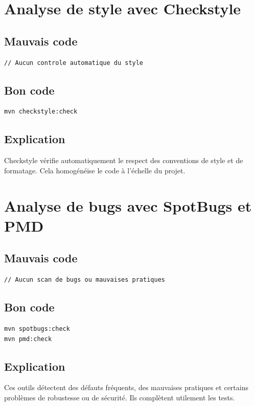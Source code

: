 \documentclass[a4paper,11pt]{report}
\begin{document}
\chapter{Analyse de style avec Checkstyle}

\section{Mauvais code}
\begin{lstlisting}
// Aucun controle automatique du style
\end{lstlisting}

\section{Bon code}
\begin{lstlisting}[language=bash]
mvn checkstyle:check
\end{lstlisting}

\section{Explication}
Checkstyle vérifie automatiquement le respect des conventions de style et de formatage.
Cela homogénéise le code à l'échelle du projet.

\chapter{Analyse de bugs avec SpotBugs et PMD}

\section{Mauvais code}
\begin{lstlisting}
// Aucun scan de bugs ou mauvaises pratiques
\end{lstlisting}

\section{Bon code}
\begin{lstlisting}[language=bash]
mvn spotbugs:check
mvn pmd:check
\end{lstlisting}

\section{Explication}
Ces outils détectent des défauts fréquents, des mauvaises pratiques et certains problèmes de robustesse ou de sécurité.
Ils complètent utilement les tests.
\end{document}
